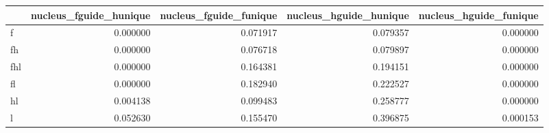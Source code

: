 \begin{tabular}{lrrrr}
\toprule
 & nucleus_fguide_hunique & nucleus_fguide_funique & nucleus_hguide_hunique & nucleus_hguide_funique \\
\midrule
f & 0.000000 & 0.071917 & 0.079357 & 0.000000 \\
fh & 0.000000 & 0.076718 & 0.079897 & 0.000000 \\
fhl & 0.000000 & 0.164381 & 0.194151 & 0.000000 \\
fl & 0.000000 & 0.182940 & 0.222527 & 0.000000 \\
hl & 0.004138 & 0.099483 & 0.258777 & 0.000000 \\
l & 0.052630 & 0.155470 & 0.396875 & 0.000153 \\
\bottomrule
\end{tabular}
